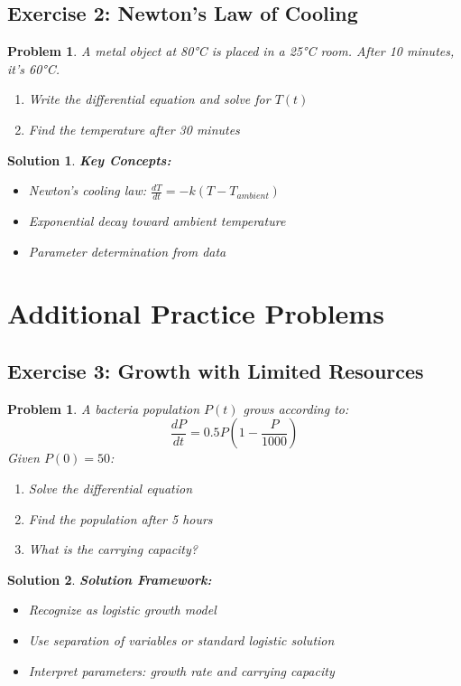 \documentclass[12pt, letterpaper]{book}
\newcounter{problemcounter}[chapter]
\theoremstyle{problemstyle}
\newtheorem{problem}[problemcounter]{Problem}
\theoremstyle{solutionstyle}
\newtheorem*{solution}{Solution}
\begin{document}
\subsection{Exercise 2: Newton's Law of Cooling}

\begin{problem}
A metal object at 80°C is placed in a 25°C room. After 10 minutes, it's 60°C.
\begin{enumerate}
    \item Write the differential equation and solve for $T(t)$
    \item Find the temperature after 30 minutes
\end{enumerate}
\end{problem}

\begin{solution}
\textbf{Key Concepts:}
\begin{itemize}
    \item Newton's cooling law: $\frac{dT}{dt} = -k(T - T_{ambient})$
    \item Exponential decay toward ambient temperature
    \item Parameter determination from data
\end{itemize}
\end{solution}

\section{Additional Practice Problems}

\subsection{Exercise 3: Growth with Limited Resources}

\begin{problem}
A bacteria population $P(t)$ grows according to:
$$\frac{dP}{dt} = 0.5P\left(1-\frac{P}{1000}\right)$$
Given $P(0) = 50$:
\begin{enumerate}
    \item Solve the differential equation
    \item Find the population after 5 hours
    \item What is the carrying capacity?
\end{enumerate}
\end{problem}

\begin{solution}
\textbf{Solution Framework:}
\begin{itemize}
    \item Recognize as logistic growth model
    \item Use separation of variables or standard logistic solution
    \item Interpret parameters: growth rate and carrying capacity
\end{itemize}
\end{solution}
\end{document}
